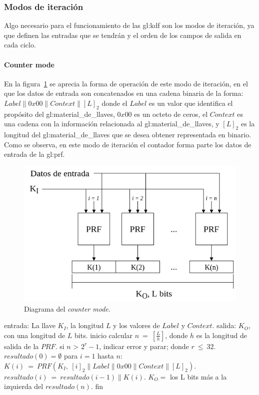 \subsubsection{Modos de iteración}

Algo necesario para el funcionamiento de las \gls{gl:kdf} son los modos de
iteración, ya que definen las entradas que se tendrán y el orden de los campos
de salida en cada ciclo.

\paragraph{Counter mode}
En la figura~\ref{diagrama_counter_mode} se aprecia la forma de operación de
este modo de iteración, en el que los datos de entrada son concatenados en una
cadena binaria de la forma: $Label \parallel 0x00 \parallel Context \parallel
{[L]}_2$ donde el $Label$ es un valor que identifica el propósito del
\gls{gl:material_de_llaves}, $0x00$ es un octeto de ceros, el $Context$ es una
cadena con la información relacionada al \gls{gl:material_de_llaves}, y
${[L]}_2$ es la longitud del \gls{gl:material_de_llaves} que se desea obtener
representada en binario. Como se observa, en este modo de iteración el
contador forma parte los datos de entrada de la \gls{gl:prf}.

\begin{figure}
  \begin{center}
    \includegraphics[width=0.75\linewidth]{diagramas/counter_mode}
    \caption{Diagrama del \textit{counter mode}.}
    \label{diagrama_counter_mode}
   \end{center}
\end{figure}

\begin{pseudocodigo}[caption={Funcionamiento del \textit{counter mode}.},
label={mi:1}]
    entrada:   La llave $K_I$, la longitud $L$ y los valores de $Label$ y $Context$.
    salida:    $K_O$, con una longitud de $L$ bits.
    inicio
      calcular $n\: =\: [\frac{L}{h}]$, donde $h$ es la longitud de salida de la $PRF$.
      si $n$ > $2^r-1$, indicar error y parar; donde $r\: \leq\: 32$.
      $resultado(0) = \emptyset$
      para $i=1$ hasta $n$:
        $K(i)\: =\: PRF(K_I,\: {[i]}_2 \parallel Label \parallel 0x00 \parallel Context \parallel {[L]}_2 )$.
        $resultado(i)\: =\: resultado(i-1) \parallel K(i)$.
      $K_O =$ los L bits más a la izquierda del $resultado(n)$.
    fin
\end{pseudocodigo}

